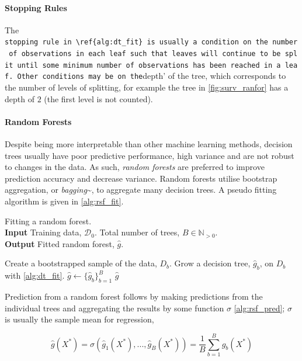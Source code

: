 \documentclass[
  letterpaper,
]{scrbook}
\let\oldparagraph\paragraph
\renewcommand{\paragraph}[1]{\oldparagraph{#1}\mbox{}}
\theoremstyle{plain}
\theoremstyle{definition}
\theoremstyle{remark}
\begin{document}
\paragraph{Stopping Rules}

The
\texttt{stopping\ rule\textquotesingle{}\ in\ \textbackslash{}ref\{alg:dt\_fit\}\ is\ usually\ a\ condition\ on\ the\ number\ of\ observations\ in\ each\ leaf\ such\ that\ leaves\ will\ continue\ to\ be\ split\ until\ some\ minimum\ number\ of\ observations\ has\ been\ reached\ in\ a\ leaf.\ Other\ conditions\ may\ be\ on\ the}depth'
of the tree, which corresponds to the number of levels of splitting, for
example the tree in \ref{fig:surv_ranfor} has a depth of \(2\) (the
first level is not counted).

\paragraph{Random Forests}

Despite being more interpretable than other machine learning methods,
decision trees usually have poor predictive performance, high variance
and are not robust to changes in the data. As such,
\emph{random forests} are preferred to improve prediction accuracy and
decrease variance. Random forests utilise bootstrap aggregation, or
\emph{bagging}\textasciitilde{}\cite{Breiman1996a}, to aggregate many
decision trees. A pseudo fitting algorithm is given in
\ref{alg:rsf_fit}.

\begin{algorithm}
\caption{Fitting a random forest. \\
\textbf{Input} Training data, $\mathcal{D}_0$. Total number of trees, $B \in \mathbb{N}_{> 0}$. \\
\textbf{Output} Fitted random forest, $\hat{g}$.}\label{alg:rsf_fit}
\begin{algorithmic}[1]
\State Create a bootstrapped sample of the data, $D_b$.
\State Grow a decision tree, $\hat{g}_b$, on $D_b$ with \ref{alg:dt_fit}.
\EndFor
\State $\hat{g}\gets \{\hat{g}_b\}^B_{b=1}$
\State\Return$\hat{g}$
\end{algorithmic}
\end{algorithm}

Prediction from a random forest follows by making predictions from the
individual trees and aggregating the results by some function \(\sigma\)
\ref{alg:rsf_pred}; \(\sigma\) is usually the sample mean for
regression,

\[
\hat{g}(X^*) = \sigma(\hat{g}_1(X^*),...,\hat{g}_B(X^*)) = \frac{1}{B} \sum^B_{b=1} \hat{g}_b(X^*)
\]
\end{document}
